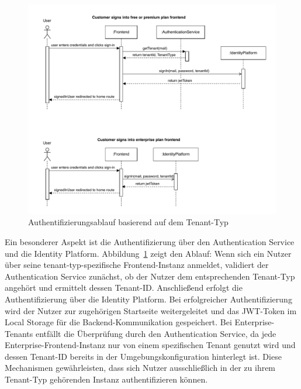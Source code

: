 \begin{figure}[H]
	\centering
	\includegraphics[width=\textwidth]{resources/03-runtime-view/pdf/authentication-sequence.pdf}
	\caption{Authentifizierungsablauf basierend auf dem Tenant-Typ}
	\label{fig:authentication-sequence}
\end{figure}

Ein besonderer Aspekt ist die Authentifizierung über den Authentication Service und die Identity Platform. Abbildung~\ref{fig:authentication-sequence} zeigt den Ablauf:
Wenn sich ein Nutzer über seine tenant-typ-spezifische Frontend-Instanz anmeldet, validiert der Authentication Service zunächst, ob der Nutzer dem entsprechenden Tenant-Typ angehört und ermittelt dessen Tenant-ID. Anschließend erfolgt die Authentifizierung über die Identity Platform. Bei erfolgreicher Authentifizierung wird der Nutzer zur zugehörigen Startseite weitergeleitet und das JWT-Token im Local Storage für die Backend-Kommunikation gespeichert.
Bei Enterprise-Tenants entfällt die Überprüfung durch den Authentication Service, da jede Enterprise-Frontend-Instanz nur von einem spezifischen Tenant genutzt wird und dessen Tenant-ID bereits in der Umgebungskonfiguration hinterlegt ist. Diese Mechanismen gewährleisten, dass sich Nutzer ausschließlich in der zu ihrem Tenant-Typ gehörenden Instanz authentifizieren können.

